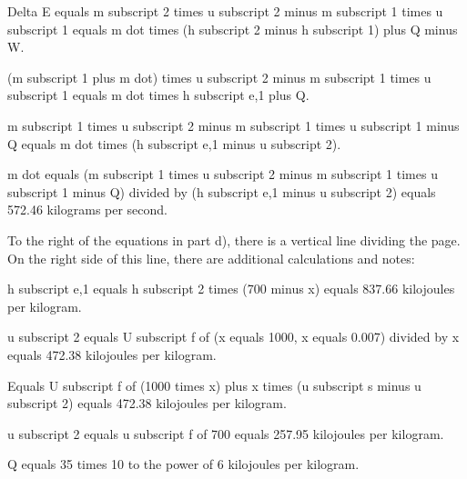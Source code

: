 Delta E equals m subscript 2 times u subscript 2 minus m subscript 1 times u subscript 1 equals m dot times (h subscript 2 minus h subscript 1) plus Q minus W.

(m subscript 1 plus m dot) times u subscript 2 minus m subscript 1 times u subscript 1 equals m dot times h subscript e,1 plus Q.

m subscript 1 times u subscript 2 minus m subscript 1 times u subscript 1 minus Q equals m dot times (h subscript e,1 minus u subscript 2).

m dot equals (m subscript 1 times u subscript 2 minus m subscript 1 times u subscript 1 minus Q) divided by (h subscript e,1 minus u subscript 2) equals 572.46 kilograms per second.

To the right of the equations in part d), there is a vertical line dividing the page. On the right side of this line, there are additional calculations and notes:

h subscript e,1 equals h subscript 2 times (700 minus x) equals 837.66 kilojoules per kilogram.

u subscript 2 equals U subscript f of (x equals 1000, x equals 0.007) divided by x equals 472.38 kilojoules per kilogram.

Equals U subscript f of (1000 times x) plus x times (u subscript s minus u subscript 2) equals 472.38 kilojoules per kilogram.

u subscript 2 equals u subscript f of 700 equals 257.95 kilojoules per kilogram.

Q equals 35 times 10 to the power of 6 kilojoules per kilogram.